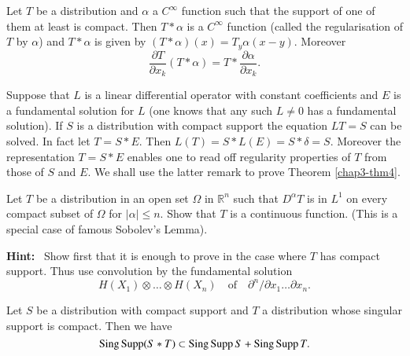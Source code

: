 \begin{theorem}
Let $T$ be a distribution and $\alpha$ a $C^{\infty}$ function such
that the support of one of them at least is compact. Then $T\ast
\alpha$ is a $C^{\infty}$ function (called the regularisation of $T$
by $\alpha$) and $T\ast \alpha$ is given by
$(T\ast\alpha)(x)=T_{y}\alpha(x-y)$. Moreover
$$
\frac{\partial T}{\partial x_{k}}(T\ast \alpha)=T\ast \frac{\partial
  \alpha}{\partial x_{k}}.
$$\pageoriginale
\end{theorem}

Suppose that $L$ is a linear differential operator with constant
coefficients and $E$ is a fundamental solution for $L$ (one knows that
any such $L\neq 0$ has a fundamental solution). If $S$ is a
distribution with compact support the equation $LT=S$ can be
solved. In fact let $T=S\ast E$. Then $L(T)=S\ast L(E)=S\ast
\delta=S$. Moreover the representation $T=S\ast E$ enables one to read
off regularity properties of $T$ from those of $S$ and $E$. We shall
use the latter remark to prove Theorem \ref{chap3-thm4}.

\begin{exer*}
Let $T$ be a distribution in an open set $\Omega$ in $\mathbb{R}^{n}$
such that $D^{\alpha}T$ is in $L^{1}$ on every compact subset of
$\Omega$ for $|\alpha|\leq n$. Show that $T$ is a continuous
function. (This is a special case of famous Sobolev's Lemma).
\end{exer*}

\noindent
{\bf Hint:}~ Show first that it is enough to prove in the case where
$T$ has compact support. Thus use convolution by the fundamental
solution 
$$
H(X_{1})\otimes\ldots\otimes H(X_{n})\quad\text{of}\quad
\partial^{n}/\partial x_{1}\ldots \partial x_{n}.
$$

\begin{proposition}\label{chap3-prop7}
Let $S$ be a distribution with compact support and $T$ a distribution
whose singular support is compact. Then we have
$$
\operatorname{Sing} \operatorname{Supp} (S\ast T)\subset \operatorname{Sing} \operatorname{Supp} S+\operatorname{Sing} \operatorname{Supp} T.
$$
\end{proposition}

